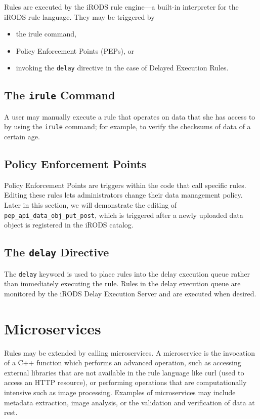 \documentclass[10pt,oneside]{memoir}
\begin{document}
Rules are executed by the iRODS rule engine---a built-in interpreter for the iRODS rule language. They may be triggered by
\begin{itemize}
 \item the irule command,
 \item Policy Enforcement Points (PEPs), or
 \item invoking the \texttt{delay} directive in the case of Delayed Execution Rules.
\end{itemize}

\subsection{The \texttt{irule} Command}

A user may manually execute a rule that operates on data that she has access to by using the \texttt{irule} command; for example, to verify the checksums of data of a certain age.

\subsection{Policy Enforcement Points}

Policy Enforcement Points are triggers within the code that call specific rules. Editing these rules lets administrators change their data management policy. Later in this section, we will demonstrate the editing of \texttt{pep\_api\_data\_obj\_put\_post}, which is triggered after a newly uploaded data object is registered in the iRODS catalog.

\subsection{The \texttt{delay} Directive}

The \texttt{delay} keyword is used to place rules into the delay execution queue rather than immediately executing the rule. Rules in the delay execution queue are monitored by the iRODS Delay Execution Server and are executed when desired.

\section{Microservices}

Rules may be extended by calling microservices. A microservice is the invocation of a C++ function which performs an advanced operation, such as accessing external libraries that are not available in the rule language like curl (used to access an HTTP resource), or performing operations that are computationally intensive such as image processing. Examples of microservices may include metadata extraction, image analysis, or the validation and verification of data at rest.
\end{document}

